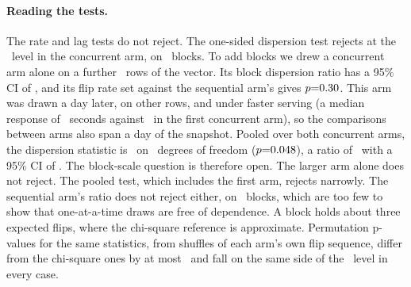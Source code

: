 \keeprunin
\paragraph{Reading the tests.} The rate and lag tests do not reject.
The one-sided dispersion test rejects at the \indepLevel\ level in the
concurrent arm, on \indepBlocks\ blocks.
To add blocks we drew a concurrent arm alone on a further
\indepExtRows\ rows of the vector. Its block
dispersion ratio has a 95\% CI of \indepExtDispersionCi, and its flip
rate set against the sequential arm's gives $p{=}0.30$.
This arm was
drawn a day later, on other rows, and under faster serving (a median
response of \indepExtMedianLatency\ seconds against
\indepConcMedianLatency\ in the first concurrent arm), so the
comparisons between arms also span a day of the snapshot. Pooled over
both concurrent arms, the
dispersion statistic is \indepPooledChi\ on \indepPooledDf\ degrees of
freedom ($p{=}0.048$), a ratio of \indepPooledDispersion\
with a 95\% CI of \indepPooledDispersionCi. The block-scale question
is therefore open. The larger arm alone does not reject. The pooled
test, which includes the first arm, rejects narrowly. The sequential
arm's ratio does not reject either, on \indepSeqBlocks\ blocks, which
are too few to show that one-at-a-time draws are free of dependence. A
block holds about three expected flips, where the chi-square reference
is approximate. Permutation p-values for the same statistics, from
shuffles of each arm's own flip sequence, differ from the chi-square
ones by at most \indepPermGap\ and fall on the same side of the
\indepLevel\ level in every case.

